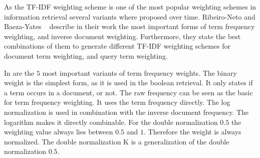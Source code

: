 As the TF-IDF weighting scheme is one of the most popular weighting schemes in information retrieval several variants where proposed over time. Ribeiro-Neto and Baeza-Yates ~\cite{ModernInvormationRetrieval1999} describe in their work the most important forms of term frequency weighting, and inverse document weighting. Furthermore, they state the best combinations of them to generate different TF-IDF weighting schemes for document term weighting, and query term weighting.

In  are the $5$ most important variants of term frequency weights. The binary weight is the simplest form, as it is used in the boolean retrieval. It only states if a term occurs in a document, or not. The raw frequency can be seen as the basic for term frequency weighting. It uses the term frequency directly. The log normalization is used in combination with the inverse document frequency. The logarithm makes it directly combinable. For the double normalization $0.5$ the weighting value always lies between $0.5$ and $1$. Therefore the weight is always normalized. The double normalization K is a generalization of the double normalization $0.5$.

